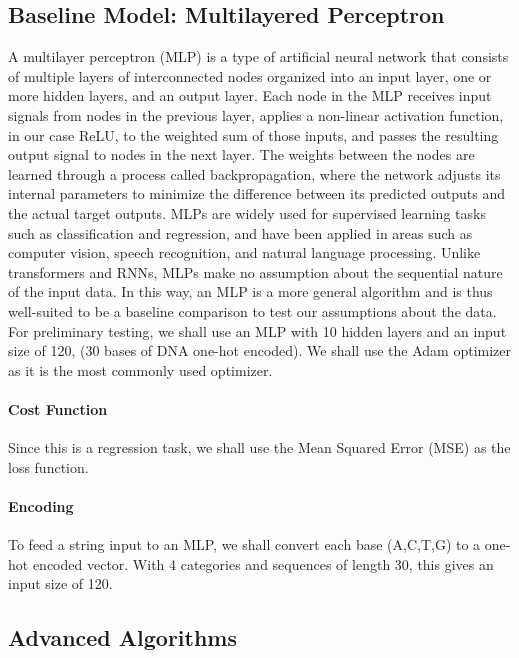 \documentclass[11pt]{article}
\begin{document}
\subsection{Baseline Model: Multilayered Perceptron}
A multilayer perceptron (MLP) is a type of artificial neural network that consists of multiple layers of interconnected nodes organized into an input layer, one or more hidden layers, and an output layer. Each node in the MLP receives input signals from nodes in the previous layer, applies a non-linear activation function, in our case ReLU, to the weighted sum of those inputs, and passes the resulting output signal to nodes in the next layer. The weights between the nodes are learned through a process called backpropagation, where the network adjusts its internal parameters to minimize the difference between its predicted outputs and the actual target outputs. MLPs are widely used for supervised learning tasks such as classification and regression, and have been applied in areas such as computer vision, speech recognition, and natural language processing. Unlike transformers and RNNs, MLPs make no assumption about the sequential nature of the input data. In this way, an MLP is a more general algorithm and is thus well-suited to be a baseline comparison to test our assumptions about the data. For preliminary testing, we shall use an MLP with 10 hidden layers and an input size of 120, (30 bases of DNA one-hot encoded). We shall use the Adam optimizer as it is the most commonly used optimizer.

\paragraph{Cost Function}
Since this is a regression task, we shall use the Mean Squared Error (MSE) as the loss function.

\paragraph{Encoding}
To feed a string input to an MLP, we shall convert each base (A,C,T,G) to a one-hot encoded vector. With 4 categories and sequences of length 30, this gives an input size of 120.


\subsection{Advanced Algorithms}
\end{document}
